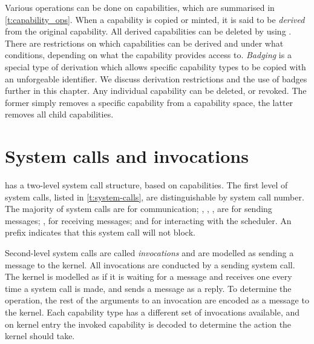 Various operations can be done on capabilities, which are summarised in \cref{t:capability_ops}.
When a capability is copied or minted, it is said to be \emph{derived} from the original capability.
All derived capabilities can be deleted by using .
There are restrictions on which capabilities can be derived and under what conditions, depending on
what the capability provides access to. 
\emph{Badging} is a special type of derivation which allows specific capability types to be copied
with an unforgeable identifier. We discuss derivation restrictions and the use of badges further
in this chapter.
Any individual capability can be deleted, or revoked. The former simply removes a specific
capability from a capability space, the latter removes all child capabilities.

\section{System calls and invocations}

\selfour has a two-level system call structure, based on capabilities. The first level of system
calls, listed in \cref{t:system-calls}, are distinguishable by system call number.  The majority of
system calls are for communication; , , ,  are for
sending messages; ,  for receiving messages; and  for
interacting with the scheduler. An  prefix indicates that this system call will not block.

Second-level system calls are called \emph{invocations} and are modelled as sending a message
to the kernel. All invocations are conducted by a sending system call. The kernel is modelled as if
it is waiting for a message and receives one every time a system call is made, and sends a message
as a reply. 
To determine the operation, the rest of the arguments to an invocation are encoded as a message to
the kernel. Each capability type has a different set of invocations available, and on kernel entry 
 the invoked capability is decoded to determine the action the kernel should take. 

